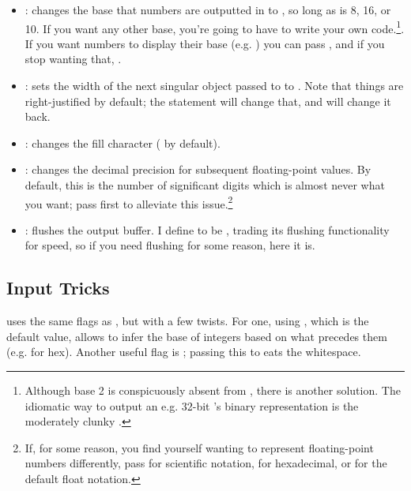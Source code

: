\documentclass[../main]{subfiles}
\begin{document}
        \begin{itemize}
            \item {}: changes the base that numbers are outputted in to , so long as  is 8, 16, or 10. If you want any other base, you're going to have to write your own code.\footnote{Although base 2 is conspicuously absent from , there is another solution. The idiomatic way to output an e.g. 32-bit 's binary representation is the moderately clunky .}. If you want numbers to display their base (e.g. ) you can pass , and if you stop wanting that, .
            
            \item {}: sets the width of the next singular object passed to  to . Note that things are right-justified by default; the statement  will change that, and  will change it back.
            
            \item {}: changes the fill character ( by default).
            
            \item {}: changes the decimal precision for subsequent floating-point values. By default, this is the number of significant digits which is almost never what you want; pass  first to alleviate this issue.\footnote{If, for some reason, you find yourself wanting to represent floating-point numbers differently, pass  for scientific notation,  for hexadecimal, or  for the default float notation.}

            \item {}: flushes the output buffer. I define  to be , trading its flushing functionality for speed, so if you need flushing for some reason, here it is.
        \end{itemize}

    \subsection{Input Tricks}

         uses the same  flags as , but with a few twists. For one, using , which is the default value, allows  to infer the base of integers based on what precedes them (e.g.  for hex). Another useful flag is ; passing this to  eats the whitespace.\\
\end{document}

